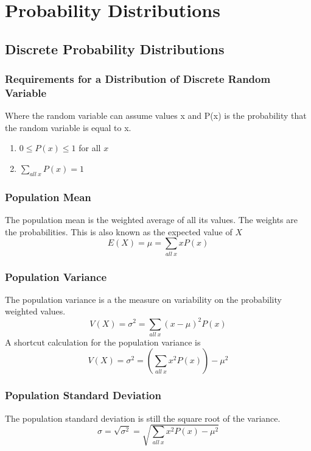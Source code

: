 \documentclass{article}
\begin{document}
\section{Probability Distributions}

\subsection{Discrete Probability Distributions}

\subsubsection{Requirements for a Distribution of Discrete Random Variable}

Where the random variable can assume values x and P(x) is the probability
that the random variable is equal to x.

\begin{enumerate}
\item $0 \leq P(x) \leq 1$ for all $x$
\item $\sum\limits_{all\:x}P(x) = 1$ 
\end{enumerate}

\subsubsection{Population Mean}
The population mean is the weighted average of all its values. The weights are the probabilities. This is also known as the expected value of $X$
\begin{equation}
E(X) = \mu = \sum\limits_{all\:x}xP(x)
\end{equation}

\subsubsection{Population Variance}
The population variance is a the measure on variability on the probability weighted values.
\begin{equation}
V(X) = \sigma^2 = \sum\limits_{all\:x}(x-\mu)^2P(x)
\end{equation}A shortcut calculation for the population variance is
\begin{equation}
V(X) = \sigma^2 = \left(\sum\limits_{all\:x}x^2P(x)\right) - \mu^2
\end{equation}

\subsubsection{Population Standard Deviation}
The population standard deviation is still the square root of the variance.
\begin{equation}
\sigma = \sqrt{\sigma^2} = \sqrt{\sum\limits_{all\:x}x^2P(x) - \mu^2}
\end{equation}
\end{document}
